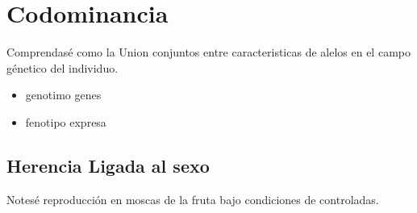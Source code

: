 \section{Codominancia}

Comprendasé como la Union conjuntos entre caracteristicas de alelos en el campo génetico del individuo. 

\begin{itemize}
  \item genotimo genes
  \item fenotipo expresa
\end{itemize}

\subsection{Herencia Ligada al sexo}

Notesé reproducción en moscas de la fruta bajo condiciones de controladas. 


